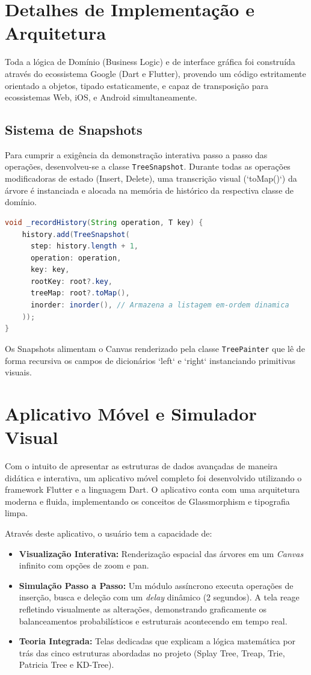 \documentclass[12pt,a4paper]{article}
\begin{document}
\section{Detalhes de Implementação e Arquitetura}
Toda a lógica de Domínio (Business Logic) e de interface gráfica foi construída através do ecossistema Google (Dart e Flutter), provendo um código estritamente orientado a objetos, tipado estaticamente, e capaz de transposição para ecossistemas Web, iOS, e Android simultaneamente.

\subsection{Sistema de Snapshots}
Para cumprir a exigência da demonstração interativa passo a passo das operações, desenvolveu-se a classe \texttt{TreeSnapshot}. Durante todas as operações modificadoras de estado (Insert, Delete), uma transcrição visual (`toMap()`) da árvore é instanciada e alocada na memória de histórico da respectiva classe de domínio.

\begin{lstlisting}[language=Java, caption=Captura do Estado em Snapshot nas operacoes]
void _recordHistory(String operation, T key) {
    history.add(TreeSnapshot(
      step: history.length + 1,
      operation: operation,
      key: key,
      rootKey: root?.key,
      treeMap: root?.toMap(),
      inorder: inorder(), // Armazena a listagem em-ordem dinamica
    ));
}
\end{lstlisting}

Os Snapshots alimentam o Canvas renderizado pela classe \texttt{TreePainter} que lê de forma recursiva os campos de dicionários `left` e `right` instanciando primitivas visuais.


\section{Aplicativo Móvel e Simulador Visual}
Com o intuito de apresentar as estruturas de dados avançadas de maneira didática e interativa, um aplicativo móvel completo foi desenvolvido utilizando o framework Flutter e a linguagem Dart. O aplicativo conta com uma arquitetura moderna e fluida, implementando os conceitos de Glassmorphism e tipografia limpa.

Através deste aplicativo, o usuário tem a capacidade de:
\begin{itemize}
    \item \textbf{Visualização Interativa:} Renderização espacial das árvores em um \textit{Canvas} infinito com opções de zoom e pan.
    \item \textbf{Simulação Passo a Passo:} Um módulo assíncrono executa operações de inserção, busca e deleção com um \textit{delay} dinâmico (2 segundos). A tela reage refletindo visualmente as alterações, demonstrando graficamente os balanceamentos probabilísticos e estruturais acontecendo em tempo real.
    \item \textbf{Teoria Integrada:} Telas dedicadas que explicam a lógica matemática por trás das cinco estruturas abordadas no projeto (Splay Tree, Treap, Trie, Patricia Tree e KD-Tree).
\end{itemize}
\end{document}
